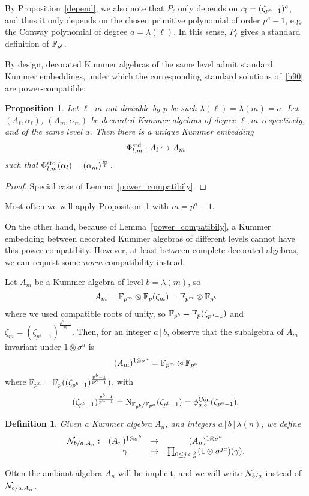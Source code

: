 \documentclass{sig-alternate}
\newtheorem{proposition}[theorem]{Proposition}
\newtheorem{definition}[theorem]{Definition}
\begin{document}
By Proposition~\ref{depend}, we also note that $P_\ell$ only depends on $c_{l}=(\zeta_{p^a-1})^a$,
and thus it only depends on the chosen primitive polynomial of order $p^a-1$,
e.g. the Conway polynomial of degree $a=\lambda(\ell)$.
In this sense, $P_\ell$ gives a standard definition of $\mathbb{F}_{p^l}$.

By design, decorated Kummer algebras of the same level admit standard Kummer embeddings,
under which the corresponding standard solutions of~\eqref{h90} are power-compatible:
\begin{proposition}
\label{embedincomplete}
Let $\ell\,|\,m$ not divisible by $p$ be such $\lambda(\ell)=\lambda(m)=a$.
Let $(A_\ell,\alpha_\ell)$, $(A_m,\alpha_m)$ be decorated Kummer algebras
of degree $\ell,m$ respectively, and of the same level $a$.
Then there is a unique Kummer embedding
\[ {\Phi^{\textrm{std}}_{{l},{m}}}:A_l\hookrightarrow A_m \]
such that ${\Phi^{\textrm{std}}_{{l},{m}}}(\alpha_l)=(\alpha_m)^{\frac{m}{l}}$.
\end{proposition}
\begin{proof}
Special case of Lemma~\ref{power_compatibily}.
\end{proof}
Most often we will apply Proposition~\ref{embedincomplete} with $m=p^a-1$.

On the other hand, because of Lemma~\ref{power_compatibily}, a Kummer embedding
between decorated Kummer algebras of different levels cannot have this power-compatibity.
However, at least between complete decorated algebras, we can request some \emph{norm}-compatibility
instead.

Let $A_m$ be a Kummer algebra of level $b=\lambda(m)$, so
\[ A_m=\mathbb{F}_{p^m}\otimes\mathbb{F}_{p}(\zeta_m)=\mathbb{F}_{p^m}\otimes\mathbb{F}_{p^b} \]
where we used compatible roots of unity, so $\mathbb{F}_{p^b}=\mathbb{F}_{p}(\zeta_{p^b-1})$
and $\zeta_m=(\zeta_{p^b-1})^{\frac{p^b-1}{m}}$.
Then, for an integer $a\,|\,b$,
observe that the subalgebra of $A_m$ invariant under $1\otimes\sigma^a$ is
\[ (A_m)^{1\otimes\sigma^a}=\mathbb{F}_{p^m}\otimes\mathbb{F}_{p^a} \]
where $\mathbb{F}_{p^a}=\mathbb{F}_{p}((\zeta_{p^b-1})^{\frac{p^b-1}{p^a-1}})$, with
\[ (\zeta_{p^b-1})^{\frac{p^b-1}{p^a-1}}=\operatorname{N}_{\mathbb{F}_{p^b}/\mathbb{F}_{p^a}}(\zeta_{p^b-1})={\phi^{\textrm{Con}}_{{a},{b}}}(\zeta_{p^a-1}). \]

\begin{definition}
\label{def:norm}
Given a Kummer algebra $A_n$, and integers $a\,|\,b\,|\,\lambda(n)$, we define
\[
\begin{array}{cccc}
  \mathcal{N}_{b/a,A_n}: & (A_n)^{1\otimes\sigma^b} & \to & (A_n)^{1\otimes\sigma^a} \\
  & \gamma & \mapsto & \prod_{0\leq j<\frac{b}{a}} (1 \otimes \sigma^{ja})(\gamma).
\end{array}
\]
\end{definition}
Often the ambiant algebra $A_n$ will be implicit,
and we will write $\mathcal{N}_{b/a}$ instead of $\mathcal{N}_{b/a,A_n}$.
\end{document}
